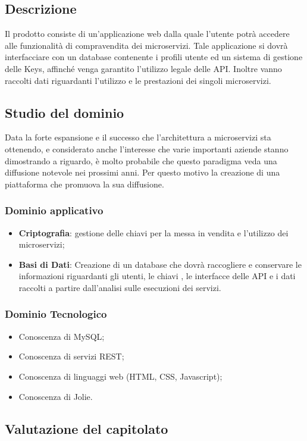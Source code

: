 \documentclass[12pt,a4paper,titlepage]{article}
\begin{document}
\subsection{Descrizione}
Il prodotto consiste di un'applicazione web dalla quale l'utente potrà accedere alle funzionalità di compravendita dei microservizi. Tale applicazione si dovrà interfacciare con un database contenente i profili utente ed un sistema di gestione delle Keys, affinché venga garantito l'utilizzo legale delle API. Inoltre vanno raccolti dati riguardanti l'utilizzo e le prestazioni dei singoli microservizi.

\subsection{Studio del dominio}
Data la forte espansione e il successo che l'architettura a microservizi sta ottenendo, e considerato anche l'interesse che varie importanti aziende stanno dimostrando a riguardo, è molto probabile che questo paradigma veda una diffusione notevole nei prossimi anni. Per questo motivo la creazione di una piattaforma che promuova la sua diffusione.
\subsubsection{Dominio applicativo} %
\begin{itemize}
	\item \textbf{Criptografia}: gestione delle chiavi per la messa in vendita e l'utilizzo dei microservizi;
	\item \textbf{Basi di Dati}: Creazione di un database che dovrà raccogliere e conservare le informazioni riguardanti gli utenti, le chiavi , le interfacce delle API e i dati raccolti a partire dall'analisi sulle esecuzioni dei servizi.
\end{itemize}
\subsubsection{Dominio Tecnologico}
\begin{itemize}
	\item Conoscenza di MySQL;
	\item Conoscenza di servizi REST;
	\item Conoscenza di linguaggi web (HTML, CSS, Javascript);
	\item Conoscenza di Jolie.
\end{itemize}

\subsection{Valutazione del capitolato}
\end{document}
